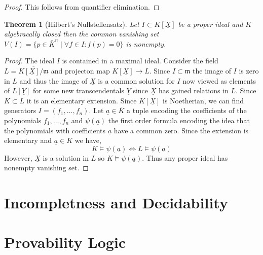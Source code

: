 \documentclass[12pt]{article}
\newcommand{\entails}{\models}
\newcommand{\ul}[1]{\underline{#1}}
\newcommand{\maxideal}{\mathfrak{m}}
\theoremstyle{theorem}
\newtheorem{theorem}{Theorem}[section]
\theoremstyle{definition}
\theoremstyle{definition}
\theoremstyle{remark}
\theoremstyle{definition}
\theoremstyle{remark}
\begin{document}
\begin{proof}
This follows from quantifier elimination.
\end{proof}

\begin{theorem}[Hilbert's Nullstellensatz]
Let $I \subset K[\ul{X}]$ be a proper ideal and $K$ algebracally closed then the common vanishing set $V(I) = \{p \in \bar{K}^n \mid \forall f \in I : f(p) = 0 \}$ is nonempty. 
\end{theorem}

\begin{proof}
The ideal $I$ is contained in a maximal ideal. Consider the field $L = \overline{K[\ul{X}] / \maxideal}$ and projecton map $K[\ul{X}] \to L$. Since $I \subset \maxideal$ the image of $I$ is zero in $L$ and thus the image of $\ul{X}$ is a common solution for $I$ now viewed as elements of $L[\ul{Y}]$ for some new transcendentals $\ul{Y}$ since $\ul{X}$ has gained relations in $L$. Since $K \subset L$ it is an elementary extension.
Since $K[\ul{X}]$ is Noetherian, we can find generators $I = (f_1, \dots, f_n)$. Let $\ul{a} \in \overline{K}$ a tuple encoding the coefficients of the polynomials $f_1, \dots, f_n$ and $\psi(\ul{a})$ the first order formula encoding the idea that the polynomials with coefficients $\ul{a}$ have a common zero. Since the extension is elementary and $\ul{a} \in K$ we have,
\[ K \entails \psi(\ul{a}) \iff L \entails \psi(\ul{a}) \]
However, $\ul{X}$ is a solution in $L$ so $K \entails \psi(\ul{a})$. Thus any proper ideal has nonempty vanishing set. 
\end{proof}

\section{Incompletness and Decidability}

\section{Provability Logic}
\end{document}

